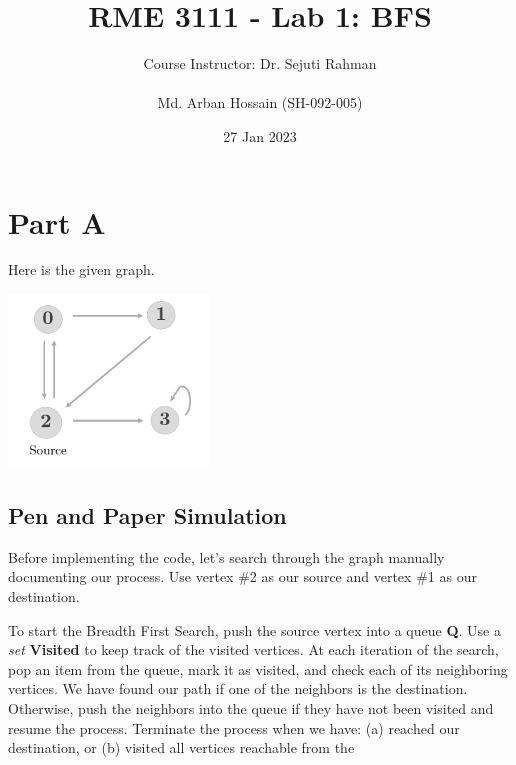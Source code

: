 \documentclass[12pt]{article}
\title{RME 3111 - Lab 1: BFS}
\author{
    Course Instructor: Dr. Sejuti Rahman\\
    \\
    Md. Arban Hossain (SH-092-005)\\
    }
\date{27 Jan 2023}
\begin{document}

\maketitle





\section*{Part A}

Here is the given graph.\\

\begin{center}
    \includegraphics[width=0.4\textwidth]{Graph.png}
\end{center}
    
\subsection*{Pen and Paper Simulation}

Before implementing the code, let's search through the graph manually documenting our process. Use vertex \#2 as our source and vertex \#1 as our destination.

\vspace{5mm} %

To start the Breadth First Search, push the source vertex into a queue \textbf{Q}. Use a \textit{set} \textbf{Visited} to keep track of the visited vertices. At each iteration of the search, pop an item from the queue, mark it as visited, and check each of its neighboring vertices. We have found our path if one of the neighbors is the destination. Otherwise, push the neighbors into the queue if they have not been visited and resume the process. Terminate the process when we have: (a) reached our destination, or (b) visited all vertices reachable from the 
\end{document}
